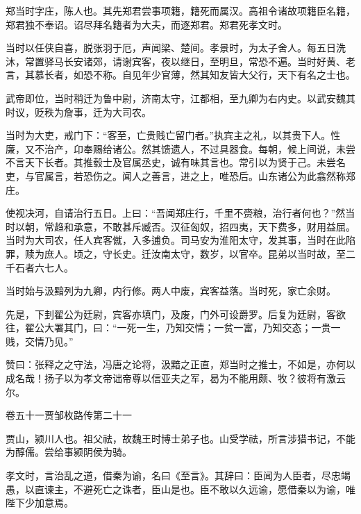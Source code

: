 \documentclass[12pt,UTF8]{ctexbook}
\begin{document}
郑当时字庄，陈人也。其先郑君尝事项籍，籍死而属汉。高祖令诸故项籍臣名籍，郑君独不奉诏。诏尽拜名籍者为大夫，而逐郑君。郑君死孝文时。



当时以任侠自喜，脱张羽于厄，声闻梁、楚间。孝景时，为太子舍人。每五日洗沐，常置驿马长安诸郊，请谢宾客，夜以继日，至明旦，常恐不遍。当时好黄、老言，其慕长者，如恐不称。自见年少官薄，然其知友皆大父行，天下有名之士也。



武帝即位，当时稍迁为鲁中尉，济南太守，江都相，至九卿为右内史。以武安魏其时议，贬秩为詹事，迁为大司农。



当时为大吏，戒门下：“客至，亡贵贱亡留门者。”执宾主之礼，以其贵下人。性廉，又不治产，卬奉赐给诸公。然其馈遗人，不过具器食。每朝，候上间说，未尝不言天下长者。其推毂士及官属丞史，诚有味其言也。常引以为贤于己。未尝名吏，与官属言，若恐伤之。闻人之善言，进之上，唯恐后。山东诸公为此翕然称郑庄。



使视决河，自请治行五日。上曰：“吾闻郑庄行，千里不赍粮，治行者何也？”然当时以朝，常趋和承意，不敢甚斥臧否。汉征匈奴，招四夷，天下费多，财用益屈。当时为大司农，任人宾客僦，入多逋负。司马安为淮阳太守，发其事，当时在此陷罪，赎为庶人。顷之，守长史。迁汝南太守，数岁，以官卒。昆弟以当时故，至二千石者六七人。



当时始与汲黯列为九卿，内行修。两人中废，宾客益落。当时死，家亡余财。



先是，下刲翟公为廷尉，宾客亦填门，及废，门外可设爵罗。后复为廷尉，客欲往，翟公大署其门，曰：“一死一生，乃知交情；一贫一富，乃知交态；一贵一贱，交情乃见。”



赞曰：张释之之守法，冯唐之论将，汲黯之正直，郑当时之推士，不如是，亦何以成名哉！扬子以为孝文帝诎帝尊以信亚夫之军，曷为不能用颇、牧？彼将有激云尔。





卷五十一贾邹枚路传第二十一



贾山，颍川人也。祖父祛，故魏王时博士弟子也。山受学祛，所言涉猎书记，不能为醇儒。尝给事颍阴侯为骑。



孝文时，言治乱之道，借秦为谕，名曰《至言》。其辞曰：臣闻为人臣者，尽忠竭愚，以直谏主，不避死亡之诛者，臣山是也。臣不敢以久远谕，愿借秦以为谕，唯陛下少加意焉。
\end{document}
